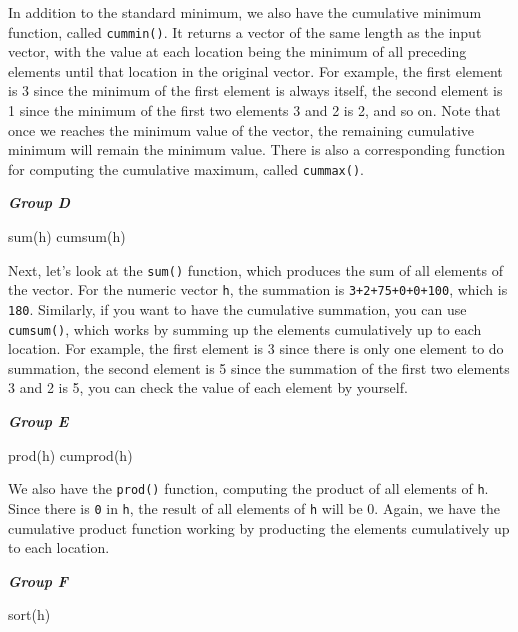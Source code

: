 \documentclass[
]{book}
\newenvironment{Shaded}{\begin{snugshade}}{\end{snugshade}}
\newcommand{\FunctionTok}[1]{\textcolor[rgb]{0.00,0.00,0.00}{#1}}
\newcommand{\NormalTok}[1]{#1}
\begin{document}
In addition to the standard minimum, we also have the cumulative minimum function, called \texttt{cummin()}. It returns a vector of the same length as the input vector, with the value at each location being the minimum of all preceding elements until that location in the original vector. For example, the first element is 3 since the minimum of the first element is always itself, the second element is 1 since the minimum of the first two elements 3 and 2 is 2, and so on. Note that once we reaches the minimum value of the vector, the remaining cumulative minimum will remain the minimum value. There is also a corresponding function for computing the cumulative maximum, called \texttt{cummax()}.

\textbf{\emph{Group D}}

\begin{Shaded}
\begin{Highlighting}[]
\FunctionTok{sum}\NormalTok{(h)}
\FunctionTok{cumsum}\NormalTok{(h)}
\end{Highlighting}
\end{Shaded}

Next, let's look at the \texttt{sum()} function, which produces the sum of all elements of the vector. For the numeric vector \texttt{h}, the summation is \texttt{3+2+75+0+0+100}, which is \texttt{180}. Similarly, if you want to have the cumulative summation, you can use \texttt{cumsum()}, which works by summing up the elements cumulatively up to each location. For example, the first element is 3 since there is only one element to do summation, the second element is 5 since the summation of the first two elements 3 and 2 is 5, you can check the value of each element by yourself.

\textbf{\emph{Group E}}

\begin{Shaded}
\begin{Highlighting}[]
\FunctionTok{prod}\NormalTok{(h)}
\FunctionTok{cumprod}\NormalTok{(h)}
\end{Highlighting}
\end{Shaded}

We also have the \texttt{prod()} function, computing the product of all elements of \texttt{h}. Since there is \texttt{0} in \texttt{h}, the result of all elements of \texttt{h} will be 0. Again, we have the cumulative product function working by producting the elements cumulatively up to each location.

\textbf{\emph{Group F}}

\begin{Shaded}
\begin{Highlighting}[]
\FunctionTok{sort}\NormalTok{(h)}
\end{Highlighting}
\end{Shaded}
\end{document}
